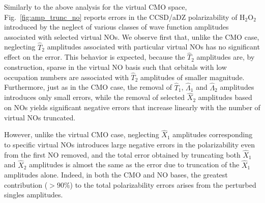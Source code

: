 \documentclass[11pt,article]{achemso}
\begin{document}
Similarly to the above analysis for the virtual CMO space,
Fig.~\ref{fig:amp_trunc_no} reports errors in the CCSD/aDZ polarizability of
H$_2$O$_2$ introduced by the neglect of various classes of wave function
amplitudes associated with selected virtual NOs.  We observe first that,
unlike the CMO case, neglecting $\hat{T}_2$ amplitudes associated with
particular virtual NOs has no significant effect on the error.  This behavior
is expected, because the $\hat{T}_2$ amplitudes are, by construction, sparse
in the virtual NO basis such that orbitals with low occupation numbers are
associated with $\hat{T}_2$ amplitudes of smaller magnitude.  Furthermore,
just as in the CMO case, the removal of $\hat{T}_1$, $\hat{\Lambda}_1$ and
$\hat{\Lambda}_2$ amplitudes introduces only small errors, while the removal
of selected $\hat{X}_2$ amplitudes based on NOs yields significant negative
errors that increase linearly with the number of virtual NOs truncated.

However, unlike the virtual CMO case, neglecting $\hat{X}_1$ amplitudes
corresponding to specific virtual NOs introduces large negative errors in the
polarizability even from the first NO removed, and the total error obtained by
truncating both $\hat{X}_1$ and $\hat{X}_2$ amplitudes is almost the same as
the error due to truncation of the $\hat{X}_1$ amplitudes alone.  Indeed, in
both the CMO and NO bases, the greatest contribution ($>90\%$) to the
total polarizability errors arises from the perturbed singles amplitudes.
\end{document}
